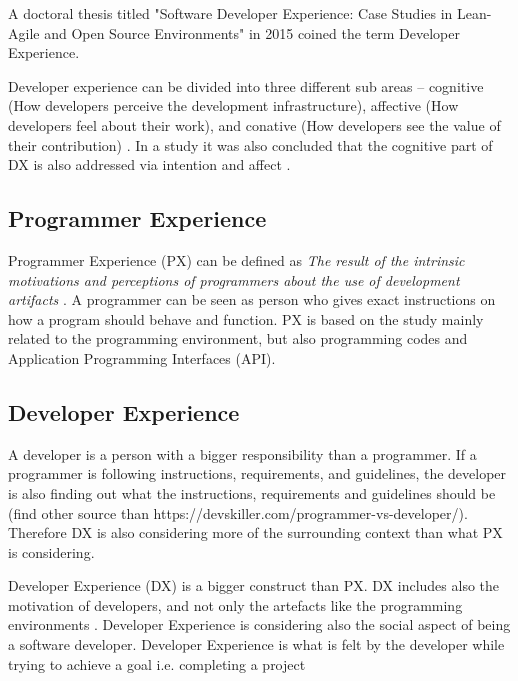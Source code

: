 \documentclass[english, 12pt, a4paper, sci, utf8, a-1b, online]{aaltothesis}
\begin{document}
A doctoral thesis titled "Software Developer Experience:
Case Studies in Lean-Agile and Open Source Environments" in 2015 coined the term Developer Experience.

Developer experience can be divided into three different sub areas – cognitive (How developers perceive the development infrastructure), affective (How developers feel about their work), and conative (How developers see the value of their contribution) \cite{fagerholm-dx-concept-and-definition}. In a study it was also concluded that the cognitive part of DX is also addressed via intention and affect \cite{kuusinen-flow}.

\subsection{Programmer Experience}


Programmer Experience (PX) can be defined as \textit{The result of the intrinsic motivations and perceptions of programmers about the use of development artifacts} \cite{programmer-experience}. A programmer can be seen as person who gives exact instructions on how a program should behave and function. PX is based on the study mainly related to the programming environment, but also programming codes and Application Programming Interfaces (API).

\subsection{Developer Experience}

A developer is a person with a bigger responsibility than a programmer. If a programmer is following instructions, requirements, and guidelines, the developer is also finding out what the instructions, requirements and guidelines should be {\color{gray} (find other source than https://devskiller.com/programmer-vs-developer/).} Therefore DX is also considering more of the surrounding context than what PX is considering.

Developer Experience (DX) is a bigger construct than PX. DX includes also the motivation of developers, and not only the artefacts like the programming environments \cite{programmer-experience}. Developer Experience is considering also the social aspect of being a software developer. Developer Experience is what is felt by the developer while trying to achieve a goal i.e. completing a project
\end{document}
